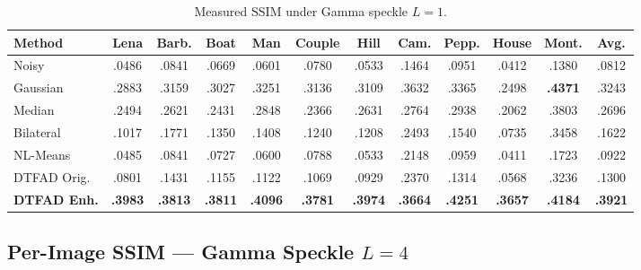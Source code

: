 \documentclass[12pt,a4paper]{article}
\newcommand{\best}[1]{\textcolor{bestgreen}{\textbf{#1}}}
\newcommand{\second}[1]{\textcolor{secondbest}{\textbf{#1}}}
\begin{document}
\begin{table}[H]
\centering
\caption{Measured SSIM under Gamma speckle $L=1$.}
\label{tab:ssim_L1_measured}
\small
\setlength{\tabcolsep}{3pt}
\begin{tabular}{l*{10}{c}|c}
\toprule
\textbf{Method} & \textbf{Lena} & \textbf{Barb.} & \textbf{Boat} & \textbf{Man} & \textbf{Couple} & \textbf{Hill} & \textbf{Cam.} & \textbf{Pepp.} & \textbf{House} & \textbf{Mont.} & \textbf{Avg.} \\
\midrule
\rowcolor{lightblue!30}
Noisy & .0486 & .0841 & .0669 & .0601 & .0780 & .0533 & .1464 & .0951 & .0412 & .1380 & .0812 \\
\midrule
Gaussian & .2883 & .3159 & .3027 & .3251 & .3136 & .3109 & .3632 & .3365 & .2498 & \best{.4371} & .3243 \\
Median & .2494 & .2621 & .2431 & .2848 & .2366 & .2631 & .2764 & .2938 & .2062 & .3803 & .2696 \\
Bilateral & .1017 & .1771 & .1350 & .1408 & .1240 & .1208 & .2493 & .1540 & .0735 & .3458 & .1622 \\
NL-Means & .0485 & .0841 & .0727 & .0600 & .0788 & .0533 & .2148 & .0959 & .0411 & .1723 & .0922 \\
DTFAD Orig. & .0801 & .1431 & .1155 & .1122 & .1069 & .0929 & .2370 & .1314 & .0568 & .3236 & .1300 \\
\textbf{DTFAD Enh.} & \best{.3983} & \best{.3813} & \best{.3811} & \best{.4096} & \best{.3781} & \best{.3974} & \best{.3664} & \best{.4251} & \best{.3657} & \second{.4184} & \best{.3921} \\
\bottomrule
\end{tabular}
\end{table}

\subsection{Per-Image SSIM — Gamma Speckle $L=4$}
\end{document}

